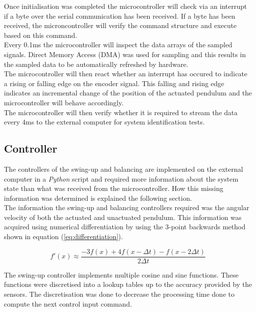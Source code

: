 Once initialisation was completed the microcontroller will check via an interrupt if a byte over the serial communication has been received. If a byte has been received, the microncontroller will verify the command structure and execute based on this command.\\

Every 0.1ms the microcontroller will inspect the data arrays of the sampled signals. Direct Memory Access (DMA) was used for sampling and this results in the sampled data to be automatically refreshed by hardware.\\

The microcontroller will then react whether an interrupt has occured to indicate a rising or falling edge on the encoder signal. This falling and rising edge indicates an incremental change of the position of the actuated pendulum and the microcontroller will behave accordingly.\\

The microcontroller will then verify whether it is required to stream the data every 4ms to the external computer for system identification tests.\\

\subsection{Controller}
The controllers of the swing-up and balancing are implemented on the external computer in a \textit{Python} script and required more information about the system state than what was received from the microcontroller. How this missing information was determined is explained the following section.\\

The information the swing-up and balancing controllers required was the angular velocity of both the actuated and unactuated pendulum. This information was acquired using numerical differentiation by using the 3-point backwards method shown in equation (\ref{eq:differentiation}).

\begin{equation} \label{eq:differentiation}
f'(x) \approx \frac{-3f(x)  +  4f(x-{\Delta}t)  -  f(x-2{\Delta}t)}{ 2{\Delta}t }
\end{equation}

The swing-up controller implements multiple cosine and sine functions. These functions were discretised into a lookup tables up to the accuracy provided by the sensors. The discretisation was done to decrease the processing time done to compute the next control input command.


